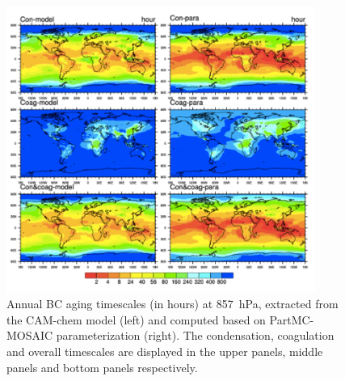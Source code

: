 \documentclass[12pt, fullpage]{uiucthesis2009_2}
\begin{document}
	\begin{figure}[h] 
		\begin{center}
			\includegraphics[width = 0.9\textwidth]{Figure33}
			\caption[Annual BC aging timescales (in hours) at 857~hPa, extracted from the CAM-chem model (left) and computed based on PartMC-MOSAIC parameterization (right). The condensation, coagulation and overall timescales are displayed in the upper panels, middle panels and bottom panels respectively]{\label{fig_p33} Annual BC aging timescales (in hours) at 857~hPa, extracted from the CAM-chem model (left) and computed based on PartMC-MOSAIC parameterization (right). The condensation, coagulation and overall timescales are displayed in the upper panels, middle panels and bottom panels respectively. }
		\end{center}
	\end{figure}
	
\end{document}
